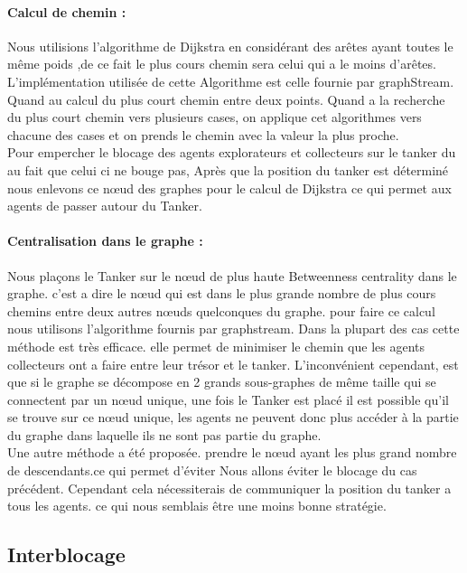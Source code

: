 \documentclass[10pt]{article}
\newcommand\tab[1][0.65cm]{\hspace*{#1}}
\begin{document}
\paragraph{Calcul de chemin :} Nous utilisions l'algorithme de Dijkstra en considérant des arêtes ayant toutes le même poids ,de ce fait le plus cours chemin sera celui qui a le moins d'arêtes. L'implémentation utilisée de cette Algorithme est celle fournie par graphStream. Quand au calcul du plus court chemin entre deux  points. Quand a la recherche du plus court chemin vers plusieurs cases, on applique cet algorithmes vers chacune des cases et on prends le chemin avec la valeur la plus proche.\\
\tab Pour empercher le blocage des agents explorateurs et collecteurs sur le tanker du au fait que celui ci ne bouge pas, Après que la position du tanker est déterminé nous enlevons ce nœud des graphes pour le calcul de Dijkstra ce qui permet aux agents de passer autour du Tanker.
\paragraph{Centralisation dans le graphe :} Nous plaçons le Tanker sur le nœud de plus haute Betweenness centrality dans le graphe. c'est a dire le nœud  qui est dans le plus grande nombre de plus cours chemins entre deux autres nœuds quelconques du graphe. pour faire ce calcul nous utilisons l'algorithme fournis par graphstream. Dans la plupart des cas cette méthode est très efficace. elle permet de minimiser le chemin que les agents collecteurs ont a faire entre leur trésor et le tanker. L'inconvénient cependant, est que si le graphe se décompose en 2 grands sous-graphes de même taille qui se connectent par un nœud unique, une fois le Tanker est placé il est possible qu'il se trouve sur ce nœud unique, les agents ne peuvent donc plus accéder à la partie du graphe dans laquelle ils ne sont pas partie du graphe.\\
\tab Une autre méthode a été proposée. prendre le nœud ayant les plus grand nombre de descendants.ce qui permet d'éviter Nous allons éviter le blocage du cas précédent. Cependant cela nécessiterais de communiquer la position du tanker a tous les agents. ce qui nous semblais être une moins bonne stratégie.
	
\subsection{Interblocage}
\end{document}
